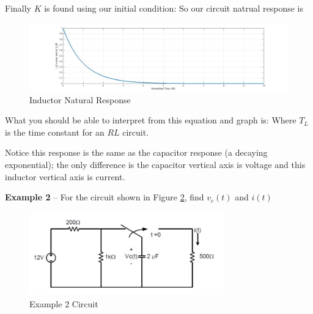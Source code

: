 \documentclass{handout}
\begin{document}
Finally $K$ is found using our initial condition:
So our circuit natrual response is
\begin{figure} [h!]
\centering
\includegraphics[width=1\textwidth]{InductorNaturalResponse.jpg}
\caption{Inductor Natural Response}
\label{fig: InductorNaturalResponse}
\end{figure}

What you should be able to interpret from this equation and graph is:
\soln{0.5in}{
\[
T_L = \frac{L}{R_L}
\]
}
Where $T_L$ is the time constant for an $RL$ circuit.

Notice this response is the same as the capacitor response (a decaying exponential); the only difference is the capacitor vertical axis is voltage and this inductor vertical axis is current.

\newpage
\clearpage
\pagebreak

\textbf{Example 2} -- For the circuit shown in Figure \ref{fig: Example2}, find $v_c(t)$ and $i(t)$

\begin{figure} [h!]
\centering
\includegraphics[width=0.75\textwidth]{Example2.jpg}
\caption{Example 2 Circuit}
\label{fig: Example2}
\end{figure}
\end{document}
